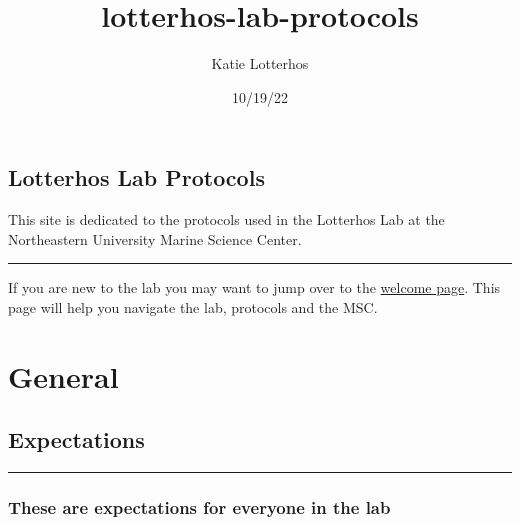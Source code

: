 \documentclass[
  letterpaper,
  DIV=11,
  numbers=noendperiod]{scrreprt}
\title{lotterhos-lab-protocols}
\author{Katie Lotterhos}
\date{10/19/22}
\renewcommand*\contentsname{Table of contents}
\newcommand\contentsname{Table of contents}
\begin{document}
\maketitle
\ifdefined\Shaded\renewenvironment{Shaded}{\begin{tcolorbox}[sharp corners, boxrule=0pt, borderline west={3pt}{0pt}{shadecolor}, interior hidden, breakable, enhanced, frame hidden]}{\end{tcolorbox}}\fi

\renewcommand*\contentsname{Table of contents}
{
\hypersetup{linkcolor=}
\setcounter{tocdepth}{2}
\tableofcontents
}

\hypertarget{lotterhos-lab-protocols}{%
\chapter*{Lotterhos Lab Protocols}\label{lotterhos-lab-protocols}}


This site is dedicated to the protocols used in the Lotterhos Lab at the
Northeastern University Marine Science Center.

\begin{center}\rule{0.5\linewidth}{0.5pt}\end{center}

If you are new to the lab you may want to jump over to the
\href{https://drk-lo.github.io/lotterhoslabprotocols/welcome/}{welcome
page}. This page will help you navigate the lab, protocols and the MSC.

\part{General}

\hypertarget{expectations}{%
\chapter{Expectations}\label{expectations}}

\begin{center}\rule{0.5\linewidth}{0.5pt}\end{center}

\hypertarget{these-are-expectations-for-everyone-in-the-lab}{%
\section*{\texorpdfstring{\textbf{These are expectations for everyone in
the
lab}}{These are expectations for everyone in the lab}}\label{these-are-expectations-for-everyone-in-the-lab}}
\end{document}
